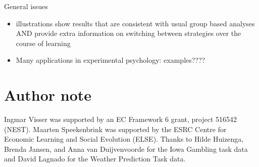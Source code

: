 \documentclass[a4paper,12pt,man]{apa} %
\begin{document}
General issues
\begin{itemize}
	\item illustrations show results that are consistent with usual group based analyses AND 
	provide extra information on switching between strategies over the course of learning
	\item Many applications in experimental psychology: examples????
\end{itemize}


\newpage

\section*{Author note}

Ingmar Visser was supported by an EC Framework 6 grant, project 516542
(NEST).  Maarten Speekenbrink was supported by the ESRC Centre for
Economic Learning and Social Evolution (ELSE).  Thanks to Hilde
Huizenga, Brenda Jansen, and Anna van Duijvenvoorde for the Iowa
Gambling task data and David Lagnado for the Weather Prediction Task
data.


\end{document}
